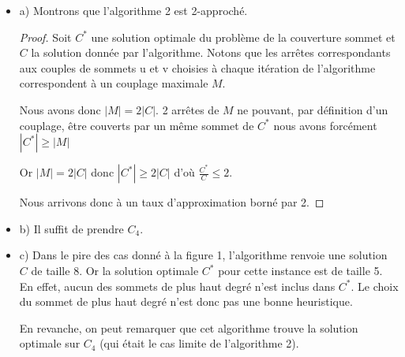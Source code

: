 \begin{itemize}
\item[] a) Montrons que l'algorithme 2 est 2-approché.
\begin{proof}
Soit $C^{*}$ une solution optimale du problème de la couverture sommet et $C$ la solution donnée par l'algorithme. Notons que les arrêtes correspondants aux couples de sommets u et v choisies à chaque itération de l'algorithme correspondent à un couplage maximale $M$. 

Nous avons donc \mbox{$|M| = 2|C|$}. 2 arrêtes de $M$ ne pouvant, par définition d'un couplage, être couverts par un même sommet de $C^{*}$ nous avons forcément \mbox{$|C^{*}| \geq |M|$}

Or \mbox{$|M| = 2|C|$} donc \mbox{$|C^{*}| \geq 2|C|$} d'où \mbox{$\frac{C^{*}}{C} \leq 2$}.

Nous arrivons donc à un taux d'approximation borné par 2.
\end{proof}

\item[] b) Il suffit de prendre $C_4$.
\item[] c) Dans le pire des cas donné à la figure 1, l'algorithme renvoie
  une solution $C$ de taille 8. Or la solution optimale $C^*$ pour cette
  instance est de taille 5. En effet, aucun des sommets de plus haut
  degré n'est inclus dans $C^{*}$. Le choix du sommet de plus haut
  degré n'est donc pas une bonne heuristique. 

En revanche, on peut remarquer que cet algorithme trouve la
  solution optimale sur $C_4$ (qui était le cas limite de l'algorithme 2).
\end{itemize}
